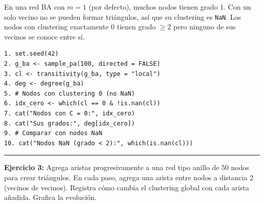 \documentclass[
  letterpaper,
  DIV=11,
  numbers=noendperiod]{scrreprt}
\begin{document}
\begin{tcolorbox}[enhanced jigsaw, toprule=.15mm, colframe=quarto-callout-note-color-frame, coltitle=black, titlerule=0mm, colback=white, breakable, leftrule=.75mm, arc=.35mm, bottomtitle=1mm, toptitle=1mm, rightrule=.15mm, bottomrule=.15mm, left=2mm, title=\textcolor{quarto-callout-note-color}{\faInfo}\hspace{0.5em}{💡 Pista 2}, colbacktitle=quarto-callout-note-color!10!white, opacityback=0, opacitybacktitle=0.6]

En una red BA con \(m = 1\) (por defecto), muchos nodos tienen grado 1.
Con un solo vecino no se pueden formar triángulos, así que su clustering
es \texttt{NaN}. Los nodos con clustering exactamente 0 tienen grado
\(\geq 2\) pero ninguno de sus vecinos se conoce entre sí.

\end{tcolorbox}

\begin{tcolorbox}[enhanced jigsaw, toprule=.15mm, colframe=quarto-callout-note-color-frame, coltitle=black, titlerule=0mm, colback=white, breakable, leftrule=.75mm, arc=.35mm, bottomtitle=1mm, toptitle=1mm, rightrule=.15mm, bottomrule=.15mm, left=2mm, title=\textcolor{quarto-callout-note-color}{\faInfo}\hspace{0.5em}{💡 Pista 3 --- Pseudocódigo}, colbacktitle=quarto-callout-note-color!10!white, opacityback=0, opacitybacktitle=0.6]

\begin{verbatim}
1. set.seed(42)
2. g_ba <- sample_pa(100, directed = FALSE)
3. cl <- transitivity(g_ba, type = "local")
4. deg <- degree(g_ba)
5. # Nodos con clustering 0 (no NaN)
6. idx_cero <- which(cl == 0 & !is.nan(cl))
7. cat("Nodos con C = 0:", idx_cero)
8. cat("Sus grados:", deg[idx_cero])
9. # Comparar con nodos NaN
10. cat("Nodos NaN (grado < 2):", which(is.nan(cl)))
\end{verbatim}

\end{tcolorbox}

\begin{center}\rule{0.5\linewidth}{0.5pt}\end{center}

\textbf{Ejercicio 3:} Agrega aristas progresivamente a una red tipo
anillo de 50 nodos para crear triángulos. En cada paso, agrega una
arista entre nodos a distancia 2 (vecinos de vecinos). Registra cómo
cambia el clustering global con cada arista añadida. Grafica la
evolución.
\end{document}
